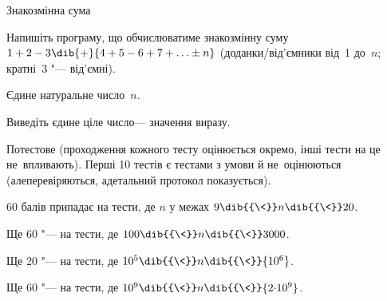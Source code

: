 \begin{problemAllDefault}{Знакозмінна сума}%

Напишіть програму, що обчислюватиме знакозмінну суму
${1+2-3}\dib{{+}}{4+5-6+7+\ldots\pm{}n}$
(доданки/від'ємники від~1 до~$n$; кратні~3 "--- від'ємні).
% 
%

\InputFile
Єдине натуральне число~$n$. %

\OutputFile
Виведіть єдине ціле число\nolinebreak[3] --- значення виразу.



\Scoring
Потестове (проходження кожного тесту оцінюється окремо, інші тести на це не~впливають). Перші 10 тестів є тестами з умови й не~оцінюються (але\nolinebreak[3] перевіряються, а\nolinebreak[3] детальний протокол показується). 

60 балів припадає на тести, де $n$ 
у
межах $9\dib{{\<}}n\dib{{\<}}20$. 

Ще 60 "--- на тести, де $100\dib{{\<}}n\dib{{\<}}3000$.

Ще 20 "--- на тести, де $10^5\dib{{\<}}n\dib{{\<}}{10^6}$.

Ще 60 "--- на тести, де $10^9\dib{{\<}}n\dib{{\<}}{2{\cdot}10^9}$.






\end{problemAllDefault}
